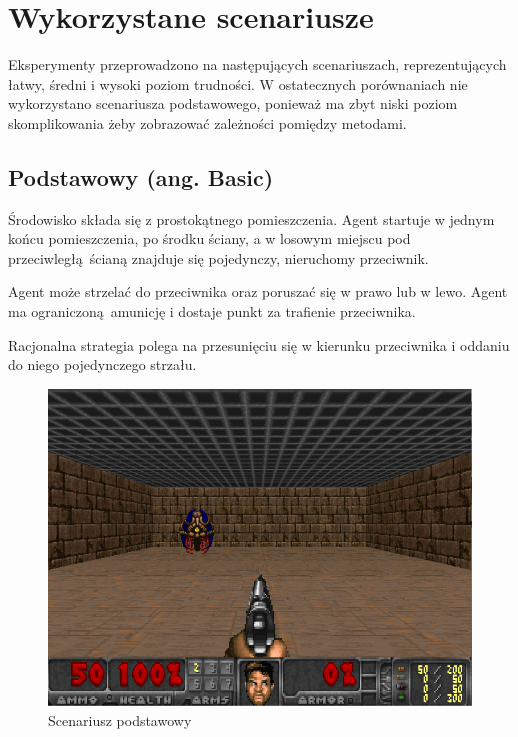 \section{Wykorzystane scenariusze}
Eksperymenty przeprowadzono na następujących scenariuszach, reprezentujących łatwy, średni i wysoki poziom trudności. W ostatecznych porównaniach nie wykorzystano scenariusza podstawowego, ponieważ ma zbyt niski poziom skomplikowania żeby zobrazować zależności pomiędzy metodami.

\subsection{Podstawowy (ang. Basic)}\label{scenario_basic}
Środowisko składa się z prostokątnego pomieszczenia. Agent startuje w jednym końcu pomieszczenia, po środku ściany, a w losowym miejscu pod przeciwległą ścianą znajduje się pojedynczy, nieruchomy przeciwnik.

Agent może strzelać do przeciwnika oraz poruszać się w prawo lub w lewo. Agent ma ograniczoną amunicję i dostaje punkt za trafienie przeciwnika.

Racjonalna strategia polega na przesunięciu się w kierunku przeciwnika i oddaniu do niego pojedynczego strzału.

\begin{center}
\begin{figure}[H]
\includegraphics[scale = 0.4]{figures/screens/scenarios/basic.png}{\caption{Scenariusz podstawowy}\label{fig:scenario_basic}}
\end{figure}
\end{center}

